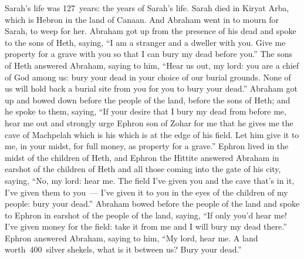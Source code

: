 
\begin{inparaenum}
     Sarah's life was 127~years: the years of Sarah's life.%
     Sarah died in Kiryat Arba, which is Hebron in the land of Canaan. And Abraham went in to mourn for Sarah, to weep for her.%
     Abraham got up from the presence of his dead and spoke to the sons of Heth, saying,%
     ``I am a stranger and a dweller with you. Give me property for a grave with you so that I can bury my dead before you.''%
     The sons of Heth answered Abraham, saying to him,%
     ``Hear us out, my lord: you are a chief of God among us: bury your dead in your choice of our burial grounds. None of us will hold back a burial site from you for you to bury your dead.''%
     Abraham got up and bowed down before the people of the land, before the sons of Heth;%
     and he spoke to them, saying, ``If your desire that I bury my dead from before me, hear me out and strongly urge Ephron son of Zohar for me%
     that he gives me the cave of Machpelah which is his which is at the edge of his field. Let him give it to me, in your midst, for full money, as property for a grave.''%
     Ephron lived in the midst of the children of Heth, and Ephron the Hittite answered Abraham in earshot of the children of Heth and all those coming into the gate of his city, saying,%
     ``No, my lord: hear me. The field I've given you and the cave that's in it, I've given them to you~--- I've given it to you in the eyes of the children of my people: bury your dead.''%
     Abraham bowed before the people of the land%
     and spoke to Ephron in earshot of the people of the land, saying, ``If only you'd hear me! I've given money for the field: take it from me and I will bury my dead there.''%
     Ephron answered Abraham, saying to him,%
     ``My lord, hear me. A land worth\understood\ 400~silver shekels, what is it between us? Bury your dead.''%

\end{inparaenum}

